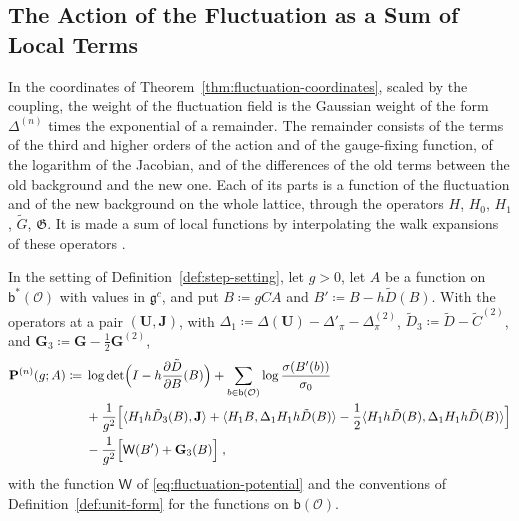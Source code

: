 \documentclass[11pt]{preprint}
\numberwithin{equation}{section}
\begin{document}
\subsection{The Action of the Fluctuation as a Sum of Local Terms}\label{sec:localised-action}

In the coordinates of Theorem~\ref{thm:fluctuation-coordinates}, scaled by the coupling, the weight of the fluctuation field is the Gaussian weight of the form $\Delta^{(n)}$ times the exponential of a remainder. The remainder consists of the terms of the third and higher orders of the action and of the gauge-fixing function, of the logarithm of the Jacobian, and of the differences of the old terms between the old background and the new one. Each of its parts is a function of the fluctuation and of the new background on the whole lattice, through the operators $H$, $H_0$, $H_1$, $\tilde G$, $\mathfrak G$. It is made a sum of local functions by interpolating the walk expansions of these operators \cite[Sect.~1]{BalabanRG2}.

\begin{definition}\label{def:fluctuation-remainder}
In the setting of Definition~\ref{def:step-setting}, let $g > 0$, let $A$ be a function on $\mathsf b^*(\mathcal O)$ with values in $\mathfrak g^c$, and put $B \coloneqq gCA$ and $B' \coloneqq B - h\tilde D(B)$. With the operators at a pair $(\mathbf U, \mathbf J)$, with $\Delta_1 \coloneqq \Delta(\mathbf U) - \Delta'_\pi - \Delta^{(2)}_\pi$, $\tilde D_3 \coloneqq \tilde D - \tilde C^{(2)}$, and $\mathbf G_3 \coloneqq \mathbf G - \frac{1}{2}\mathbf G^{(2)}$,
\begin{equation}\label{eq:fluctuation-remainder}
\begin{aligned}
    \mathbf P^{(n)}(g; A) \coloneqq{}& \log\det\Bigl(I - h\frac{\partial\tilde D}{\partial B}(B)\Bigr) + \sum_{b \in \mathsf b(\mathcal O)}\log\frac{\sigma(B'(b))}{\sigma_0}\\
    &+ \frac{1}{g^2}\Bigl[\langle H_1h\tilde D_3(B), \mathbf J\rangle + \langle H_1B, \Delta_1H_1h\tilde D(B)\rangle - \frac{1}{2}\langle H_1h\tilde D(B), \Delta_1H_1h\tilde D(B)\rangle\Bigr]\\
    &- \frac{1}{g^2}\Bigl[\mathsf W(B') + \mathbf G_3(B)\Bigr]\;,
\end{aligned}
\end{equation}
with the function $\mathsf W$ of \eqref{eq:fluctuation-potential} and the conventions of Definition~\ref{def:unit-form} for the functions on $\mathsf b(\mathcal O)$.
\end{definition}
\end{document}
